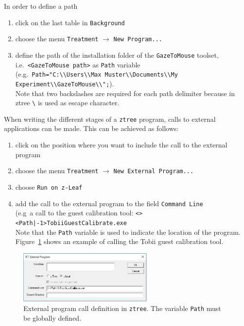 \documentclass[a4paper,oneside]{book}
\begin{document}
In order to define a path
\begin{enumerate}
    \item click on the last table in \texttt{Background}
    \item choose the menu \texttt{Treatment} $\rightarrow$ \texttt{New Program...}
    \item define the path of the installation folder of the \texttt{GazeToMouse} toolset, i.e.~\texttt{<GazeToMouse path>} as \texttt{Path} variable\\
        (e.g.~\texttt{Path="C:\textbackslash\textbackslash Users\textbackslash\textbackslash Max Muster\textbackslash\textbackslash Documents\textbackslash\textbackslash My Experiment\textbackslash\textbackslash GazeToMouse\textbackslash\textbackslash";}). \\
        Note that two backslashes are required for each path delimiter because in ztree \texttt{\textbackslash} is used as escape character.
\end{enumerate}

When writing the different stages of a \texttt{ztree} program, calls to external applications can be made.
This can be achieved as follows:
\begin{enumerate}
    \item click on the position where you want to include the call to the external program
    \item choose the menu \texttt{Treatment} $\rightarrow$ \texttt{New External Program...}
    \item choose \texttt{Run on z-Leaf}
    \item add the call to the external program to the field \texttt{Command Line} \\
        (e.g~a call to the guest calibration tool: \texttt{<><Path|-1>TobiiGuestCalibrate.exe}\\
        Note that the \texttt{Path} variable is used to indicate the location of the program.
        Figure~\ref{fig.extcall} shows an example of calling the Tobii guest calibration tool.
\end{enumerate}
\begin{figure}[ht]
    \centering
    \includegraphics[width=0.6\textwidth]{ztree_extcall.png}
    \caption{External program call definition in \texttt{ztree}. The variable \texttt{Path} must be globally defined.}
    \label{fig.extcall}
\end{figure}
\end{document}

